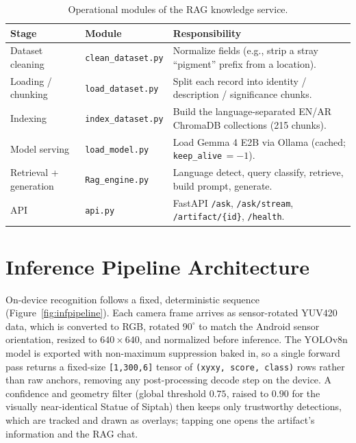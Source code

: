 \begin{table}[htbp]
\centering
\caption{Operational modules of the RAG knowledge service.}
\label{tab:ragmodules}
\begin{tabularx}{\textwidth}{@{}llX@{}}
\toprule
\textbf{Stage} & \textbf{Module} & \textbf{Responsibility}\\
\midrule
Dataset cleaning      & \texttt{clean\_dataset.py} & Normalize fields (e.g., strip a stray ``pigment'' prefix from a location).\\
Loading / chunking    & \texttt{load\_dataset.py}  & Split each record into identity / description / significance chunks.\\
Indexing              & \texttt{index\_dataset.py} & Build the language-separated EN/AR ChromaDB collections (215 chunks).\\
Model serving         & \texttt{load\_model.py}    & Load Gemma 4 E2B via Ollama (cached; \texttt{keep\_alive}\,$=-1$).\\
Retrieval + generation& \texttt{Rag\_engine.py}    & Language detect, query classify, retrieve, build prompt, generate.\\
API                   & \texttt{api.py}            & FastAPI \texttt{/ask}, \texttt{/ask/stream}, \texttt{/artifact/\{id\}}, \texttt{/health}.\\
\bottomrule
\end{tabularx}
\end{table}

\section{Inference Pipeline Architecture}

On-device recognition follows a fixed, deterministic sequence
(Figure~\ref{fig:infpipeline}). Each camera frame arrives as sensor-rotated YUV420
data, which is converted to RGB, rotated $90^{\circ}$ to match the Android sensor
orientation, resized to $640\times640$, and normalized before inference. The YOLOv8n
model is exported with non-maximum suppression baked in, so a single forward pass
returns a fixed-size \texttt{[1,300,6]} tensor of \texttt{(xyxy, score, class)} rows
rather than raw anchors, removing any post-processing decode step on the device. A
confidence and geometry filter (global threshold $0.75$, raised to $0.90$ for the
visually near-identical Statue of Siptah) then keeps only trustworthy detections, which
are tracked and drawn as overlays; tapping one opens the artifact's information and the
RAG chat.

